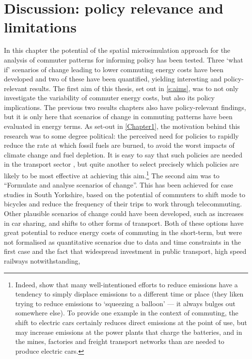 \section{Discussion: policy relevance and limitations}
\label{fc8discus}
In this chapter the potential of the spatial microsimulation approach
for the analysis of commuter patterns 
for informing policy has been tested. Three `what if' scenarios of change
leading to lower commuting energy costs have been developed and two of
these have been quantified, yielding interesting and policy-relevant results.
The first aim of this thesis, set out in \cref{s:aims}, was to not
only investigate the variability of commuter energy costs, but also its
policy implications. The previous two results chapters also have policy-relevant
findings, but it is only here that scenarios of change in commuting patterns
have been evaluated in energy terms. As set-out in \cref{Chapter1}, the
motivation behind this research was to some degree political: the perceived
need for policies to rapidly reduce the rate at which fossil fuels are burned,
to avoid the worst impacts of climate change and fuel depletion.
It is easy to say that such policies are needed in the transport sector
\citep{Chapman2007}, but quite another to select precisely which policies
are likely to be most effective at achieving this
aim.\footnote{Indeed, \citet{Berners-Lee2013}
show that many well-intentioned efforts to reduce emissions have
a tendency to simply displace emissions to a different time or place
(they liken trying to reduce emissions to `squeezing a balloon' --- it
always bulges out somewhere else). To provide one example in the context
of commuting, the shift to electric cars certainly reduces direct emissions
at the point of use, but may increase emissions at the power plants that
charge the batteries, and in the mines, factories and freight transport
networks than are needed to produce electric cars. 
}
The second aim  was to ``Formulate and analyse scenarios of change''.
This has been achieved for case studies in South Yorkshire, based on the
potential of commuters to shift mode to bicycles and reduce the frequency
of their trips to work through telecommuting. Other plausible scenarios of
change could have been developed, such as increases in car sharing, and
shifts to other forms of transport.
Both of these options have great potential to reduce energy costs of commuting
in the short-term, but were not formalised as quantitative scenarios due to
data and time constraints in the first case and the fact that widespread
investment in public transport, high speed railways notwithstanding,
